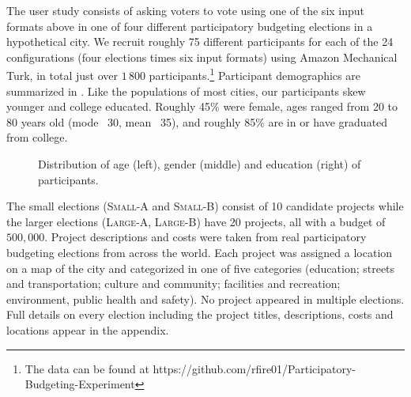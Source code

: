 \documentclass[twoside,11pt]{article}
\newcommand{\kibitz}[2]{\ifnum\Comments=1{\color{#1}{#2}}\fi}
\newcommand{\gb}[1]{\kibitz{red}{[GB:#1]}}
\begin{document}
The user study consists of asking voters to vote using one of the six input formats above in one of four different participatory budgeting elections in a hypothetical city. 
We recruit roughly 75  different participants for each of the 24 configurations (four elections times six input formats)   using Amazon Mechanical Turk, in total  just over $1\,800$ participants.\footnote{The data can be found at  https://github.com/rfire01/Participatory-Budgeting-Experiment} 
Participant demographics are summarized in . Like the populations of most cities, our participants skew younger and college educated. Roughly 45\% were female, ages ranged from 20 to 80 years old (mode ~30, mean ~35), and roughly 85\% are in or have graduated from college. 


\begin{figure}[!h]
\begin{center}
\caption{Distribution of age (left), gender (middle) and education (right) of participants. \gb{fix plot. colors, ratios. gender: probably a pie chart. axis labels + gaps + ordering on education}
}\label{fig:distribution}
\end{center}
\end{figure}

The small elections (\textsc{Small-A} and  \textsc{Small-B}) consist of 10 candidate projects while the larger elections  (\textsc{Large-A},  \textsc{Large-B}) have 20 projects, all with a budget of $500,000$.
Project descriptions and costs were taken from real participatory budgeting elections from across the world.  
Each project was assigned a location on a map of the  city  and categorized in one of five  categories   (education; streets and transportation; culture and community; facilities and recreation; environment, public health and safety). No project appeared in multiple elections.  
Full  details  on every election including the project titles, descriptions,  costs and locations appear in the appendix.
\end{document}
